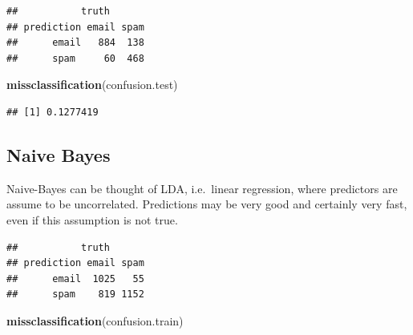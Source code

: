 \documentclass[]{book}
\newenvironment{Shaded}{\begin{snugshade}}{\end{snugshade}}
\newcommand{\KeywordTok}[1]{\textcolor[rgb]{0.13,0.29,0.53}{\textbf{#1}}}
\newcommand{\DataTypeTok}[1]{\textcolor[rgb]{0.13,0.29,0.53}{#1}}
\newcommand{\DecValTok}[1]{\textcolor[rgb]{0.00,0.00,0.81}{#1}}
\newcommand{\StringTok}[1]{\textcolor[rgb]{0.31,0.60,0.02}{#1}}
\newcommand{\CommentTok}[1]{\textcolor[rgb]{0.56,0.35,0.01}{\textit{#1}}}
\newcommand{\OperatorTok}[1]{\textcolor[rgb]{0.81,0.36,0.00}{\textbf{#1}}}
\newcommand{\NormalTok}[1]{#1}
\theoremstyle{definition}
\theoremstyle{definition}
\theoremstyle{definition}
\theoremstyle{remark}
\begin{document}
\begin{verbatim}
##           truth
## prediction email spam
##      email   884  138
##      spam     60  468
\end{verbatim}

\begin{Shaded}
\begin{Highlighting}[]
\KeywordTok{missclassification}\NormalTok{(confusion.test)}
\end{Highlighting}
\end{Shaded}

\begin{verbatim}
## [1] 0.1277419
\end{verbatim}

\subsection{Naive Bayes}\label{naive-bayes}

Naive-Bayes can be thought of LDA, i.e.~linear regression, where
predictors are assume to be uncorrelated. Predictions may be very good
and certainly very fast, even if this assumption is not true.

\begin{Shaded}
\end{Shaded}

\begin{verbatim}
##           truth
## prediction email spam
##      email  1025   55
##      spam    819 1152
\end{verbatim}

\begin{Shaded}
\begin{Highlighting}[]
\KeywordTok{missclassification}\NormalTok{(confusion.train)}
\end{Highlighting}
\end{Shaded}
\end{document}
